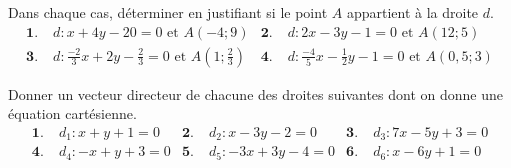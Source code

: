 \documentclass[11pt]{article}
\begin{document}
\begin{exo}
  Dans chaque cas, déterminer en justifiant si le point $A$ appartient à la
  droite $d$.
  \begin{align*}
    \textbf{1.}\; & d:x+4y-20=0\text{ et }A(-4; 9) &
    \textbf{2.}\; & d:2x-3y-1=0\text{ et }A(12; 5) \\
    \textbf{3.}\; & d:\frac{-2}{3}x+2y-\frac{2}{3}=0\text{ et }A\left(1;
    \frac{2}{3}\right) &
    \textbf{4.}\; & d:\frac{-4}{5}x-\frac{1}{2}y-1=0\text{ et }A(0,5; 3)
  \end{align*}
\end{exo}

\begin{exo}
  Donner un vecteur directeur de chacune des droites suivantes dont on donne une
  équation cartésienne.
  \begin{align*}
    \textbf{1.}\; & d_1:x+y+1=0 &
    \textbf{2.}\; & d_2:x-3y-2=0 &
    \textbf{3.}\; & d_3:7x-5y+3=0 \\
    \textbf{4.}\; & d_4:-x+y+3=0 &
    \textbf{5.}\; & d_5:-3x+3y-4=0 &
    \textbf{6.}\; & d_6:x-6y+1=0
  \end{align*}
\end{exo}
\end{document}
